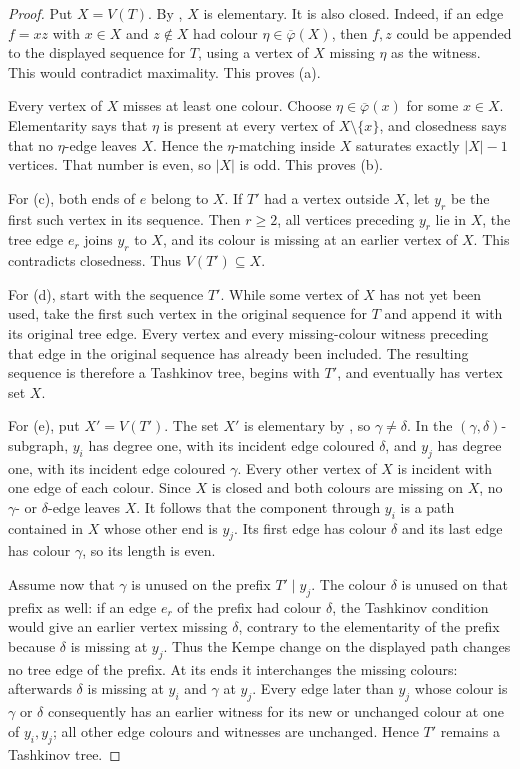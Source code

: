 \documentclass[11pt]{article}
\theoremstyle{definition}
\newcommand{\set}[1]{\{#1\}}
\newcommand{\comp}{\mathbin{\setminus}}
\begin{document}
\begin{proof}
Put $X=V(T)$. By , $X$ is elementary. It is also closed.
Indeed, if an edge $f=xz$ with $x\in X$ and $z\notin X$ had colour
$\eta\in\overline\varphi(X)$, then $f,z$ could be appended to the displayed
sequence for $T$, using a vertex of $X$ missing $\eta$ as the witness. This
would contradict maximality. This proves (a).

Every vertex of $X$ misses at least one colour. Choose
$\eta\in\overline\varphi(x)$ for some $x\in X$. Elementarity says that
$\eta$ is present at every vertex of $X\comp\set{x}$, and closedness says
that no $\eta$-edge leaves $X$. Hence the $\eta$-matching inside $X$
saturates exactly $|X|-1$ vertices. That number is even, so $|X|$ is odd.
This proves (b).

For (c), both ends of $e$ belong to $X$. If $T'$ had a vertex outside $X$,
let $y_r$ be the first such vertex in its sequence. Then $r\ge2$, all
vertices preceding $y_r$ lie in $X$, the tree edge $e_r$ joins $y_r$ to
$X$, and its colour is missing at an earlier vertex of $X$. This contradicts
closedness. Thus $V(T')\subseteq X$.

For (d), start with the sequence $T'$. While some vertex of $X$ has not yet
been used, take the first such vertex in the original sequence for $T$ and
append it with its original tree edge. Every vertex and every missing-colour
witness preceding that edge in the original sequence has already been
included. The resulting sequence is therefore a Tashkinov tree, begins with
$T'$, and eventually has vertex set $X$.

For (e), put $X'=V(T')$. The set $X'$ is elementary by
, so $\gamma\ne\delta$. In the
$(\gamma,\delta)$-subgraph, $y_i$ has degree one, with its incident edge
coloured $\delta$, and $y_j$ has degree one, with its incident edge coloured
$\gamma$. Every other vertex of $X$ is incident with one edge of each
colour. Since $X$ is closed and both colours are missing on $X$, no
$\gamma$- or $\delta$-edge leaves $X$. It follows that the component
through $y_i$ is a path contained in $X$ whose other end is $y_j$. Its first
edge has colour $\delta$ and its last edge has colour $\gamma$, so its
length is even.

Assume now that $\gamma$ is unused on the prefix
$T'\mathbin{|}y_j$. The colour $\delta$ is unused on that prefix as well:
if an edge $e_r$ of the prefix had colour $\delta$, the Tashkinov condition
would give an earlier vertex missing $\delta$, contrary to the elementarity
of the prefix because $\delta$ is missing at $y_j$. Thus the Kempe change
on the displayed path changes no tree edge of the prefix. At its ends it
interchanges the missing colours: afterwards $\delta$ is missing at $y_i$
and $\gamma$ at $y_j$. Every edge later than $y_j$ whose colour is
$\gamma$ or $\delta$ consequently has an earlier witness for its new or
unchanged colour at one of $y_i,y_j$; all other edge colours and witnesses
are unchanged. Hence $T'$ remains a Tashkinov tree.


\end{proof}
\end{document}
